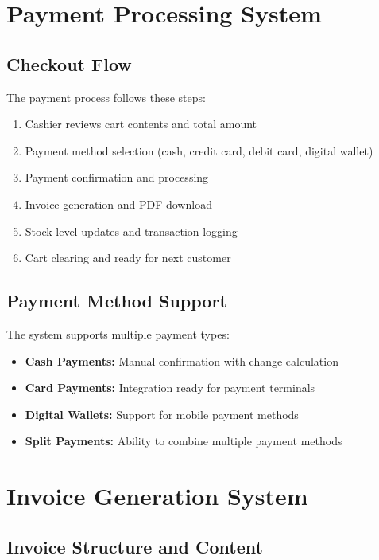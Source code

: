 \section{Payment Processing System}

\subsection*{Checkout Flow}

The payment process follows these steps:
\begin{enumerate}
  \item Cashier reviews cart contents and total amount
  \item Payment method selection (cash, credit card, debit card, digital wallet)
  \item Payment confirmation and processing
  \item Invoice generation and PDF download
  \item Stock level updates and transaction logging
  \item Cart clearing and ready for next customer
\end{enumerate}

\subsection*{Payment Method Support}

The system supports multiple payment types:
\begin{itemize}
  \item \textbf{Cash Payments:} Manual confirmation with change calculation
  \item \textbf{Card Payments:} Integration ready for payment terminals
  \item \textbf{Digital Wallets:} Support for mobile payment methods
  \item \textbf{Split Payments:} Ability to combine multiple payment methods
\end{itemize}

\section{Invoice Generation System}

\subsection*{Invoice Structure and Content}

